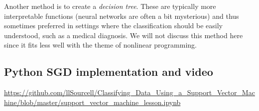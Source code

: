 \documentclass[../open-optimization/open-optimization.tex]{subfiles}
\begin{document}
Another method is to create a \emph{decision tree}.  These are typically more interpretable functions (neural networks are often a bit mysterious) and thus sometimes preferred in settings where the classification should be easily understood, such as a medical diagnosis.  We will not discuss this method here since it fits less well with the theme of nonlinear programming.




\subsection{Python SGD implementation and video}
\url{https://github.com/llSourcell/Classifying_Data_Using_a_Support_Vector_Machine/blob/master/support_vector_machine_lesson.ipynb}
\end{document}
